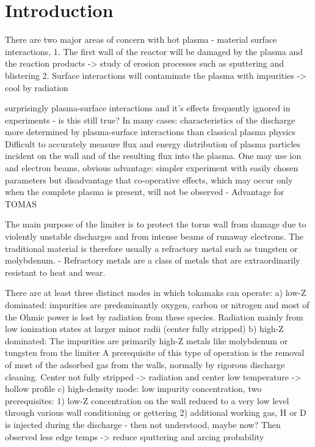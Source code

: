 \chapter{Introduction}
There are two major areas of concern with hot plasma - material surface interactions,
1. The first wall of the reactor will be damaged by the plasma and the reaction products -> study of erosion processes such as sputtering and blistering
2. Surface interactions will contaminate the plasma with impurities -> cool by radiation 

surprisingly plasma-surface interactions and it's effects frequently ignored in experiments - is this still true?
In many cases: characteristics of the discharge more determined by plasma-surface interactions than classical plasma physics
Difficult to accurately measure flux and energy distribution of plasma particles incident on the wall and of the resulting flux into the plasma.
One may use ion and electron beams, obvious advantage: simpler experiment with easily chosen parameters but disadvantage that co-operative effects, which may occur only when the complete
plasma is present, will not be observed - Advantage for TOMAS

The main purpose of the limiter is to protect the
torus wall from damage due to violently unstable
discharges and from intense beams of runaway
electrons.
The traditional material is therefore usually a refractory metal such as tungsten or molybdenum. - Refractory metals are a class of metals that are extraordinarily resistant to heat and wear.

There are at least three distinct modes in which tokamaks can operate:
a) low-Z dominated:  impurities are predominantly oxygen, carbon or nitrogen and most of the Ohmic power is lost by radiation from these species. Radiation mainly from low ionization states at larger minor radii (center fully stripped)
b) high-Z dominated: The impurities are primarily high-Z metals like molybdenum or tungsten from the limiter  A prerequisite of this type of operation is the removal of most of the adsorbed gas from the walls, normally by rigorous discharge cleaning.
    Center not fully stripped -> radiation and center low temperature -> hollow profile
c) high-density mode: low impurity concentration, two prerequisites: 
    1) low-Z concentration on the wall reduced to a very low level through various wall conditioning or gettering
    2) additional working gas, H or D is injected during the discharge - then not understood, maybe now? Then observed less edge temps -> reduce sputtering and arcing probability

